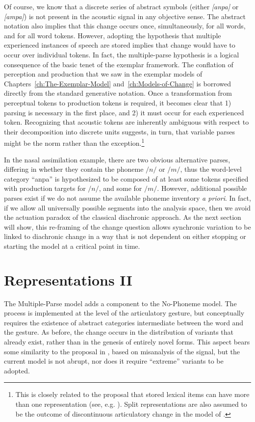 Of course, we know that a discrete series of abstract symbols (either
\emph{[anpa]} or \emph{[ampa]}) is not present in the acoustic
signal in any objective sense. The abstract notation also implies
that this change occurs once, simultaneously, for all words, and for
all word tokens. However, adopting the hypothesis that multiple experienced
instances of speech are stored implies that change would have to occur
over individual tokens. In fact, the multiple-parse hypothesis is
a logical consequence of the basic tenet of the exemplar framework.
The conflation of perception and production that we saw in the exemplar models of Chapters~\ref{ch:The-Exemplar-Model} and~\ref{ch:Models-of-Change}
is borrowed directly from the standard generative notation. Once a
transformation from perceptual tokens to production tokens is required,
it becomes clear that 1) parsing is necessary in the first place,
and 2) it must occur for each experienced token. Recognizing
that acoustic tokens are inherently ambiguous with respect to their
decomposition into discrete units suggests, in turn, that variable
parses might be the norm rather than the exception.\footnote{This is closely related to the proposal that stored lexical items
can have more than one representation (see, e.g. \citealp{hooper1976word,Janda2008,Bybee2001}).
Split representations are also assumed to be the outcome of discontinuous
articulatory change in the model of \citet{Garrett2013}.} 

In the nasal assimilation example, there are two obvious alternative
parses, differing in whether they contain the phoneme $/n/$ or $/m/$,
thus the word-level category “anpa” is hypothesized to be composed
of at least some tokens specified with production targets for $/n/$,
and some for $/m/$. However, additional possible parses exist if
we do not assume the available phoneme inventory \emph{a priori}.
In fact, if we allow all universally possible segments into the analysis
space, then we avoid the actuation paradox of the classical diachronic
approach. As the next section will show, this re-framing of the change
question allows synchronic variation to be linked to diachronic change
in a way that is not dependent on either stopping or starting the
model at a critical point in time. 

\section{Representations II}

The Multiple-Parse model adds a  component to the No-Phoneme
model. The process is implemented at the level of the articulatory
gesture, but conceptually requires the existence of abstract categories
intermediate between the word and the gesture. As before, the change
occurs in the distribution of variants that already exist, rather
than in the genesis of entirely novel forms. This aspect bears some
similarity to the proposal in \citet{Baker2011}, based on misanalysis
of the signal, but the current model is not abrupt, nor does it require
“extreme” variants to be adopted.

